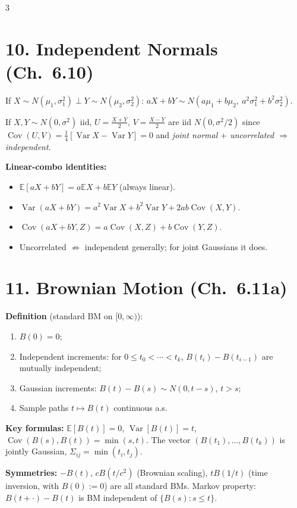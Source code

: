 \documentclass[8pt]{extarticle}
\newcommand{\E}{\mathbb{E}}
\newcommand{\Var}{\operatorname{Var}}
\newcommand{\Cov}{\operatorname{Cov}}
\begin{document}
\begin{multicols*}{3}
		\columnbreak
		
		\section*{10. Independent Normals (Ch.~6.10)}
		
		If $X\sim N(\mu_1,\sigma_1^2)\perp Y\sim N(\mu_2,\sigma_2^2)$:
		$aX+bY\sim N(a\mu_1+b\mu_2,\ a^2\sigma_1^2+b^2\sigma_2^2).$
		
		If $X,Y\sim N(0,\sigma^2)$ iid, $U=\tfrac{X+Y}{2}$, $V=\tfrac{X-Y}{2}$ are iid $N(0,\sigma^2/2)$ since $\Cov(U,V)=\tfrac14[\Var X-\Var Y]=0$ and \emph{joint normal $+$ uncorrelated $\Rightarrow$ independent}.
		
		\textbf{Linear-combo identities:}
		\begin{itemize}
			\item $\E[aX+bY]=a\E X+b\E Y$ (always linear).
			\item $\Var(aX+bY)=a^2\Var X+b^2\Var Y+2ab\Cov(X,Y)$.
			\item $\Cov(aX+bY,Z)=a\Cov(X,Z)+b\Cov(Y,Z)$.
			\item Uncorrelated $\not\Rightarrow$ independent generally; for joint Gaussians it does.
		\end{itemize}
		
		\section*{11. Brownian Motion (Ch.~6.11a)}
		
		\textbf{Definition} (standard BM on $[0,\infty)$):
		\begin{enumerate}
			\item $B(0)=0$;
			\item Independent increments: for $0\le t_0<\cdots<t_k$, $B(t_i)-B(t_{i-1})$ are mutually independent;
			\item Gaussian increments: $B(t)-B(s)\sim N(0,t-s)$, $t>s$;
			\item Sample paths $t\mapsto B(t)$ continuous a.s.
		\end{enumerate}
		
		\textbf{Key formulas:} $\E[B(t)]=0$, $\Var[B(t)]=t$, $\Cov(B(s),B(t))=\min(s,t)$. The vector $(B(t_1),\dots,B(t_k))$ is jointly Gaussian, $\Sigma_{ij}=\min(t_i,t_j)$.
		
		\textbf{Symmetries:} $-B(t)$, $cB(t/c^2)$ (Brownian scaling), $tB(1/t)$ (time inversion, with $B(0):=0$) are all standard BMs. Markov property: $B(t+\cdot)-B(t)$ is BM independent of $\{B(s):s\le t\}$.
		

\end{multicols*}
\end{document}
